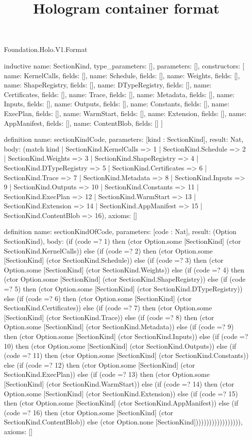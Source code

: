 \begin{lexlean}{Foundation.Holo.V1.Format}
\title{Hologram container format}
\begin{semanticmodule}
inductive{
  name: SectionKind,
  type_parameters: [],
  parameters: [],
  constructors: [
    {name: KernelCalls, fields: []},
    {name: Schedule, fields: []},
    {name: Weights, fields: []},
    {name: ShapeRegistry, fields: []},
    {name: DTypeRegistry, fields: []},
    {name: Certificates, fields: []},
    {name: Trace, fields: []},
    {name: Metadata, fields: []},
    {name: Inputs, fields: []},
    {name: Outputs, fields: []},
    {name: Constants, fields: []},
    {name: ExecPlan, fields: []},
    {name: WarmStart, fields: []},
    {name: Extension, fields: []},
    {name: AppManifest, fields: []},
    {name: ContentBlob, fields: []}
  ]
}

definition{
  name: sectionKindCode,
  parameters: [kind : SectionKind],
  result: Nat,
  body: (match kind
    | SectionKind.KernelCalls => 1
    | SectionKind.Schedule => 2
    | SectionKind.Weights => 3
    | SectionKind.ShapeRegistry => 4
    | SectionKind.DTypeRegistry => 5
    | SectionKind.Certificates => 6
    | SectionKind.Trace => 7
    | SectionKind.Metadata => 8
    | SectionKind.Inputs => 9
    | SectionKind.Outputs => 10
    | SectionKind.Constants => 11
    | SectionKind.ExecPlan => 12
    | SectionKind.WarmStart => 13
    | SectionKind.Extension => 14
    | SectionKind.AppManifest => 15
    | SectionKind.ContentBlob => 16),
  axioms: []
}

definition{
  name: sectionKindOfCode,
  parameters: [code : Nat],
  result: (Option SectionKind),
  body: (if (code =? 1) then (ctor Option.some [SectionKind] (ctor SectionKind.KernelCalls)) else (if (code =? 2) then (ctor Option.some [SectionKind] (ctor SectionKind.Schedule)) else (if (code =? 3) then (ctor Option.some [SectionKind] (ctor SectionKind.Weights)) else (if (code =? 4) then (ctor Option.some [SectionKind] (ctor SectionKind.ShapeRegistry)) else (if (code =? 5) then (ctor Option.some [SectionKind] (ctor SectionKind.DTypeRegistry)) else (if (code =? 6) then (ctor Option.some [SectionKind] (ctor SectionKind.Certificates)) else (if (code =? 7) then (ctor Option.some [SectionKind] (ctor SectionKind.Trace)) else (if (code =? 8) then (ctor Option.some [SectionKind] (ctor SectionKind.Metadata)) else (if (code =? 9) then (ctor Option.some [SectionKind] (ctor SectionKind.Inputs)) else (if (code =? 10) then (ctor Option.some [SectionKind] (ctor SectionKind.Outputs)) else (if (code =? 11) then (ctor Option.some [SectionKind] (ctor SectionKind.Constants)) else (if (code =? 12) then (ctor Option.some [SectionKind] (ctor SectionKind.ExecPlan)) else (if (code =? 13) then (ctor Option.some [SectionKind] (ctor SectionKind.WarmStart)) else (if (code =? 14) then (ctor Option.some [SectionKind] (ctor SectionKind.Extension)) else (if (code =? 15) then (ctor Option.some [SectionKind] (ctor SectionKind.AppManifest)) else (if (code =? 16) then (ctor Option.some [SectionKind] (ctor SectionKind.ContentBlob)) else (ctor Option.none [SectionKind]))))))))))))))))),
  axioms: []
}


\end{semanticmodule}
\end{lexlean}

